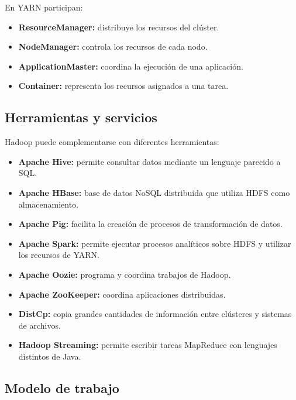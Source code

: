En YARN participan:

\begin{itemize}
    \item \textbf{ResourceManager:} distribuye los recursos del clúster.
    \item \textbf{NodeManager:} controla los recursos de cada nodo.
    \item \textbf{ApplicationMaster:} coordina la ejecución de una aplicación.
    \item \textbf{Container:} representa los recursos asignados a una tarea.
\end{itemize}

\subsection{Herramientas y servicios}

Hadoop puede complementarse con diferentes herramientas:

\begin{itemize}
    \item \textbf{Apache Hive:} permite consultar datos mediante un lenguaje
    parecido a SQL.
    
    \item \textbf{Apache HBase:} base de datos NoSQL distribuida que utiliza
    HDFS como almacenamiento.
    
    \item \textbf{Apache Pig:} facilita la creación de procesos de
    transformación de datos.
    
    \item \textbf{Apache Spark:} permite ejecutar procesos analíticos sobre
    HDFS y utilizar los recursos de YARN.
    
    \item \textbf{Apache Oozie:} programa y coordina trabajos de Hadoop.
    
    \item \textbf{Apache ZooKeeper:} coordina aplicaciones distribuidas.
    
    \item \textbf{DistCp:} copia grandes cantidades de información entre
    clústeres y sistemas de archivos.
    
    \item \textbf{Hadoop Streaming:} permite escribir tareas MapReduce con
    lenguajes distintos de Java.
\end{itemize}

\subsection{Modelo de trabajo}

